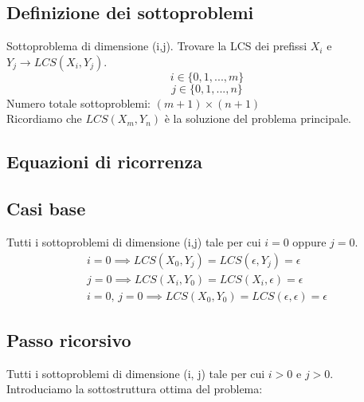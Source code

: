  \subsection{Definizione dei sottoproblemi}
 Sottoproblema di dimensione (i,j).
 Trovare la LCS dei prefissi $X_i$ e $Y_j \rightarrow LCS(X_i, Y_j)$.
 \[i \in \{0,1, ..., m\}\]
 \[j \in \{0,1,...,n\}\]
 Numero totale sottoproblemi: $(m+1)\times(n+1)$\\
 Ricordiamo che $LCS(X_m,Y_n)$ è la soluzione del problema principale.
 \subsection{Equazioni di ricorrenza}
 \subsection*{Casi base}
 Tutti i sottoproblemi di dimensione (i,j) tale per cui $i=0$ oppure $j=0$.
\begin{align*}
    i= 0 \implies LCS(X_0, Y_j) = LCS(\epsilon, Y_j) = \epsilon \\
    j = 0 \implies LCS(X_i, Y_0) = LCS(X_i, \epsilon) = \epsilon \\
    i = 0,\, j=0 \implies LCS(X_0, Y_0) = LCS(\epsilon, \epsilon) = \epsilon
\end{align*}
\subsection*{Passo ricorsivo}
Tutti i sottoproblemi di dimensione (i, j) tale per cui $i>0$ e $j>0$.\\
Introduciamo la sottostruttura ottima del problema:
